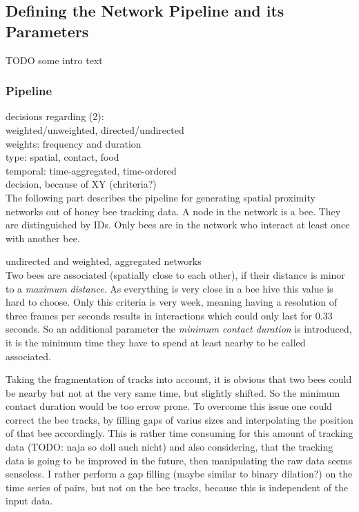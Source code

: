 \subsection{Defining the Network Pipeline and its Parameters}

TODO some intro text
\subsubsection{Pipeline}
decisions regarding (2):\\
weighted/unweighted, directed/undirected\\
weights: frequency and duration\\
type: spatial, contact, food\\
temporal: time-aggregated, time-ordered\\
decision, because of XY (chriteria?)\\


The following part describes the pipeline for generating spatial proximity networks out of honey bee tracking data. A node in the network is a bee. They are distinguished by IDs. Only bees are in the network who interact at least once with another bee.

undirected and weighted, aggregated networks\\

Two bees are associated (spatially close to each other), if their distance is minor to a \emph{maximum distance}. As everything is very close in a bee hive this value is hard to choose. Only this criteria is very week, meaning having a resolution of three frames per seconds results in interactions which could only last for $0.33$ seconds. So an additional parameter the \emph{minimum contact duration} is introduced, it is the minimum time they have to spend at least nearby to be called associated.

Taking the fragmentation of tracks into account, it is obvious that two bees could be nearby but not at the very same time, but slightly shifted. So the minimum contact duration would be too errow prone. To overcome this issue one could correct the bee tracks, by filling gaps of varius sizes and interpolating the position of that bee accordingly. This is rather time consuming for this amount of tracking data (TODO: naja so doll auch nicht) and also considering, that the tracking data is going to be improved in the future, then manipulating the raw data seems senseless. I rather perform a gap filling (maybe similar to binary dilation?) on the time series of pairs, but not on the bee tracks, because this is independent of the input data.

